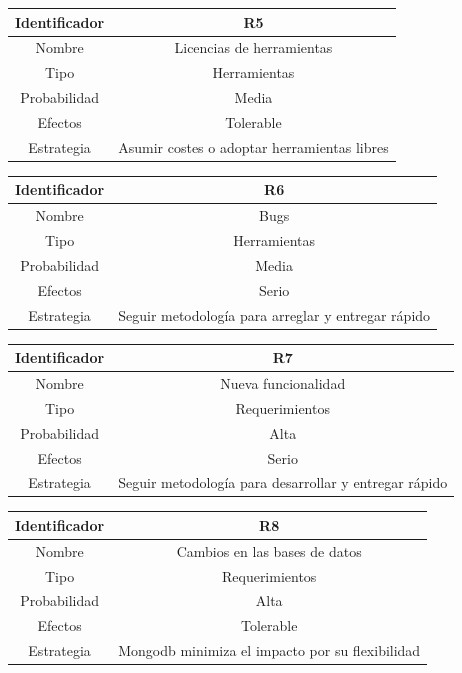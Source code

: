 \vspace{1em}
\par
\begin{tabular}{||c|c||} 
\hline
Identificador & R5 \\ [0.5ex] 
\hline\hline
Nombre & Licencias de herramientas \\ 
\hline
Tipo & Herramientas \\
\hline
Probabilidad & Media \\
\hline
Efectos & Tolerable \\
\hline
Estrategia & Asumir costes o adoptar herramientas libres \\ [1ex] 
\hline
\end{tabular}

\vspace{1em}
\par
\begin{tabular}{||c|c||} 
\hline
Identificador & R6 \\ [0.5ex] 
\hline\hline
Nombre & Bugs \\ 
\hline
Tipo & Herramientas \\
\hline
Probabilidad & Media \\
\hline
Efectos & Serio \\
\hline
Estrategia & Seguir metodología para arreglar y entregar rápido \\ [1ex] 
\hline
\end{tabular}

\vspace{1em}
\par
\begin{tabular}{||c|c||} 
\hline
Identificador & R7 \\ [0.5ex] 
\hline\hline
Nombre & Nueva funcionalidad \\ 
\hline
Tipo & Requerimientos \\
\hline
Probabilidad & Alta \\
\hline
Efectos & Serio \\
\hline
Estrategia & Seguir metodología para desarrollar y entregar rápido \\ [1ex] 
\hline
\end{tabular}

\vspace{1em}
\par
\begin{tabular}{||c|c||} 
\hline
Identificador & R8 \\ [0.5ex] 
\hline\hline
Nombre & Cambios en las bases de datos \\ 
\hline
Tipo & Requerimientos \\
\hline
Probabilidad & Alta \\
\hline
Efectos & Tolerable \\
\hline
Estrategia & Mongodb minimiza el impacto por su flexibilidad \\ [1ex] 
\hline
\end{tabular}

